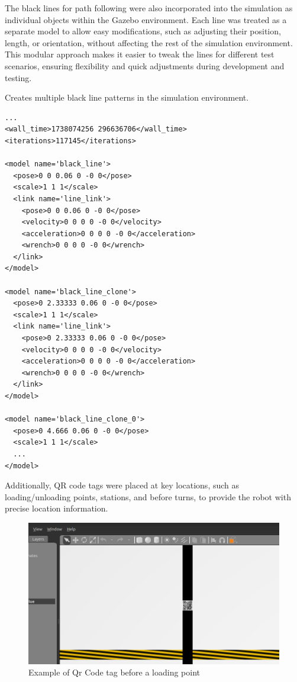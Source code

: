 \documentclass[../../main]{subfiles}
\begin{document}
    The black lines for path following were also incorporated into the simulation as 
    individual objects within the Gazebo environment. Each line was treated as a separate 
    model to allow easy modifications, such as adjusting their position, length, or 
    orientation, without affecting the rest of the simulation environment. This modular 
    approach makes it easier to tweak the lines for different test scenarios, ensuring 
    flexibility and quick adjustments during development and testing.
    \begin{codebox}[]{Creates multiple black line patterns in the simulation environment.}
      \begin{verbatim}
...
<wall_time>1738074256 296636706</wall_time>
<iterations>117145</iterations>

<model name='black_line'>
  <pose>0 0 0.06 0 -0 0</pose>
  <scale>1 1 1</scale>
  <link name='line_link'>
    <pose>0 0 0.06 0 -0 0</pose>
    <velocity>0 0 0 0 -0 0</velocity>
    <acceleration>0 0 0 0 -0 0</acceleration>
    <wrench>0 0 0 0 -0 0</wrench>
  </link>
</model>

<model name='black_line_clone'>
  <pose>0 2.33333 0.06 0 -0 0</pose>
  <scale>1 1 1</scale>
  <link name='line_link'>
    <pose>0 2.33333 0.06 0 -0 0</pose>
    <velocity>0 0 0 0 -0 0</velocity>
    <acceleration>0 0 0 0 -0 0</acceleration>
    <wrench>0 0 0 0 -0 0</wrench>
  </link>
</model>

<model name='black_line_clone_0'>
  <pose>0 4.666 0.06 0 -0 0</pose>
  <scale>1 1 1</scale>
  ...
</model>
    \end{verbatim}
  \end{codebox}

    Additionally, QR code tags were placed at key locations, such as loading/unloading points, stations, and before 
    turns, to provide the robot with precise location information.
    
    \begin{figure}[H]
        \centering
    \includegraphics[width=\textwidth]{fig/qr_code_tag.png}
    \caption{Example of Qr Code tag before a loading point}
    \label{Qr Code tags} %
    \end{figure}
\end{document}
